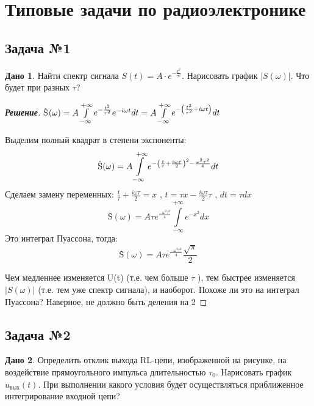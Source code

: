 \documentclass[a4paper,14pt]{extarticle}
\gdef\out{\text{вых}}
\theoremstyle{definition}
\newtheorem*{task}{Дано}
\begin{document}


\section{Типовые задачи по радиоэлектронике}

\subsection{Задача №1}

\begin{task}
	Найти спектр сигнала $S(t)=A\cdot e^{-\frac{t^2}{\tau^2}}$. Нарисовать график $|S(\omega)|$. Что будет при разных $\tau$?
\end{task}
\begin{proof}[\rm{\textbf{Решение}}]
	\^S$(\omega)=A\int\limits_{-\infty}^{+\infty}e^{-\frac{t^2}{\tau^2}}e^{-i\omega t}dt=A\int\limits_{-\infty}^{+\infty}e^{-\qty(\frac{t^2}{\tau^2}+i\omega t)}dt$

	Выделим полный квадрат в степени экспоненты:
	\begin{equation}
		\text{\^S}(\omega) = A\int\limits_{-\infty}^{+\infty}e^{-\qty(\frac{t}{\tau}+\frac{i\omega \tau}{2})^2-\frac{\omega^2 \tau^2}{4}}dt
	\end{equation}
	Сделаем замену переменных: $\frac{t}{\tau}+\frac{i\omega \tau}{2} = x$ , $t=\tau x-\frac{i\omega \tau}{2}\tau$ , $dt=\tau dx$
	\begin{equation}
		\text{\^S}(\omega)=A\tau e^{\frac{-\omega^2 \tau^2}{4}} \int\limits_{-\infty}^{+\infty}e^{-x^2}dx
	\end{equation}
	Это интеграл Пуассона, тогда: 
	\begin{equation}
		\text{\^S}(\omega)=A\tau e^{\frac{-\omega^2 \tau^2}{4}} \frac{\sqrt{\pi}}{2}
	\end{equation}

	Чем медленнее изменяется U(t) (т.е. чем больше $\tau$ ), тем быстрее изменяется $|S(\omega)|$ (т.е. тем уже спектр сигнала), и наоборот.
	Похоже ли это на интеграл Пуассона? Наверное, не должно быть деления на 2
\end{proof}







\subsection{Задача №2}
\begin{task}
Определить отклик выхода RL-цепи, изображенной на рисунке, на воздействие прямоугольного импульса длительностью $\tau_0$. Нарисовать график $u_\out(t)$. При выполнении какого условия будет осуществляться приближенное интегрирование входной цепи? 
\end{task}
\end{document}
